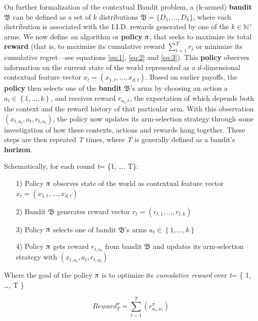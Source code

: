 \documentclass[nojss]{jss}\usepackage[]{graphicx}\usepackage[]{color}
\begin{document}
On further formalization of the contextual Bandit problem, a (k-armed) \textbf{bandit} $\mathfrak{B}$ can be defined as a set of $k$ distributions $\mathfrak{B}=\{D_{1},\dots ,D_{k}\}$, where each distribution is associated with the I.I.D. rewards generated by one of the $k\in \mathbb {N} ^{+}$ arms. We now define an algorithm or \textbf{policy} $\piup$, that seeks to maximize its total \textbf{reward} (that is, to maximize its cumulative reward $\sum_{t=1}^T r_t$ or minimize its cumulative regret---see equations \ref{eq:1}, \ref{eq:2} and \ref{eq:3}). This \textbf{policy} observes information on the current state of the world represented as a $d$-dimensional contextual feature vector \(x_{t}=\left( x_{1,t},  \dots, x_{d,t}\right)\). Based on earlier payoffs, the \textbf{policy} then selects one of the \textbf{bandit} $\mathfrak{B}$'s arms by choosing an action a \(a_{t} \in \left\{ 1, \dots, k \right\}\), and receives reward \(r_{a_{t},t}\), the expectation of which depends both the context and the reward history of that particular arm. With this observation \( (x_{t,a_t},a_{t},r_{t,a_t}) \), the policy now updates its arm-selection strategy through some investigation of how these contexts, actions and rewards hang together. These steps are then repeated \textit{T} times, where \textit{T} is generally defined as a bandit's \textbf{horizon}.

Schematically, for each round \emph{t}= \{1, \ldots, T\}:

\begin{enumerate}
         \item[1)] Policy $\piup$ observes state of the world as contextual feature vector \(x_{t}=\left( x_{1,t},  \dots, x_{d,t}\right)\)
         \item[2)] Bandit $\mathfrak{B}$ generates reward vector \(r_{t}=\left( r_{t,1},  \dots, r_{t,k}\right)\)
         \item[3)] Policy $\piup$ selects one of bandit $\mathfrak{B}$'s arms \(a_{t} \in \left\{ 1, \dots, k \right\}\)
         \item[4)] Policy $\piup$ gets reward \(r_{t,a_t}\) from bandit $\mathfrak{B}$ and updates its arm-selection strategy with \( (x_{t,a_t},a_{t},r_{t,a_t}) \)
\end{enumerate}

Where the goal of the policy $\piup$ is to optimize its \textit{cumulative reward} over \emph{t}= \{ 1, \ldots, T \}

\begin{equation} \label{eq:1}
Reward^{\pi}_{T} = \sum^{T}_{t=1}(r^{\pi}_{a_t,x_t})
\end{equation}
\end{document}

